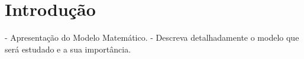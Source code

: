 \section{Introdução}

- Apresentação do Modelo Matemático.
- Descreva detalhadamente o modelo que será estudado e a sua importância.